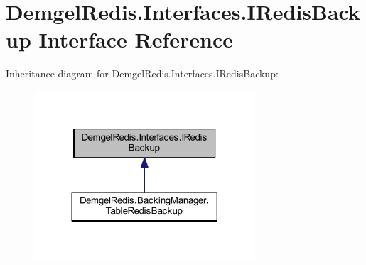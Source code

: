 \hypertarget{interface_demgel_redis_1_1_interfaces_1_1_i_redis_backup}{}\section{Demgel\+Redis.\+Interfaces.\+I\+Redis\+Backup Interface Reference}
\label{interface_demgel_redis_1_1_interfaces_1_1_i_redis_backup}


Inheritance diagram for Demgel\+Redis.\+Interfaces.\+I\+Redis\+Backup\+:
\nopagebreak
\begin{figure}[H]
\begin{center}
\leavevmode
\includegraphics[width=233pt]{interface_demgel_redis_1_1_interfaces_1_1_i_redis_backup__inherit__graph}
\end{center}
\end{figure}
